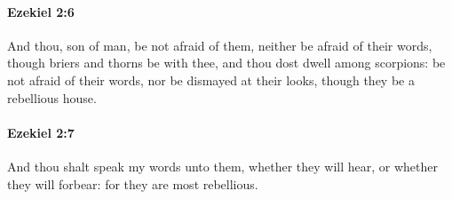 		\paragraph{Ezekiel 2:6} %
			\label{EZEKIEL-2-6}

			And thou, son of man, be not afraid of them, neither be afraid of their words, though briers and thorns be with thee, and thou dost dwell among scorpions: be not afraid of their words, nor be dismayed at their looks, though they be a rebellious house.


		\paragraph{Ezekiel 2:7} %
			\label{EZEKIEL-2-7}

			And thou shalt speak my words unto them, whether they will hear, or whether they will forbear: for they are most rebellious.


